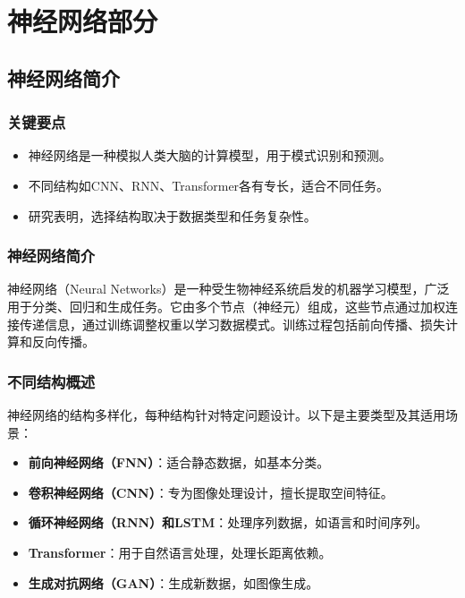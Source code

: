 \documentclass[UTF8]{report}
\theoremstyle{MyLineTheoremStyle} %
\theoremstyle{MyBlockTheoremStyle} %
\theoremstyle{MySubsubsectionStyle} %
\begin{document}
\setcounter{tocdepth}{4}                %
\tableofcontents                        %
\thispagestyle{fancy}                   %

    \newpage    



\chapter{神经网络部分}

\section{神经网络简介}

\subsection{关键要点}
\begin{itemize}
    \item 神经网络是一种模拟人类大脑的计算模型，用于模式识别和预测。
    \item 不同结构如CNN、RNN、Transformer各有专长，适合不同任务。
    \item 研究表明，选择结构取决于数据类型和任务复杂性。
\end{itemize}

\subsection{神经网络简介}
神经网络（Neural Networks）是一种受生物神经系统启发的机器学习模型，广泛用于分类、回归和生成任务。它由多个节点（神经元）组成，这些节点通过加权连接传递信息，通过训练调整权重以学习数据模式。训练过程包括前向传播、损失计算和反向传播。

\subsection{不同结构概述}
神经网络的结构多样化，每种结构针对特定问题设计。以下是主要类型及其适用场景：
\begin{itemize}
    \item \textbf{前向神经网络（FNN）}：适合静态数据，如基本分类。
    \item \textbf{卷积神经网络（CNN）}：专为图像处理设计，擅长提取空间特征。
    \item \textbf{循环神经网络（RNN）和LSTM}：处理序列数据，如语言和时间序列。
    \item \textbf{Transformer}：用于自然语言处理，处理长距离依赖。
    \item \textbf{生成对抗网络（GAN）}：生成新数据，如图像生成。
\end{itemize}
\end{document}
